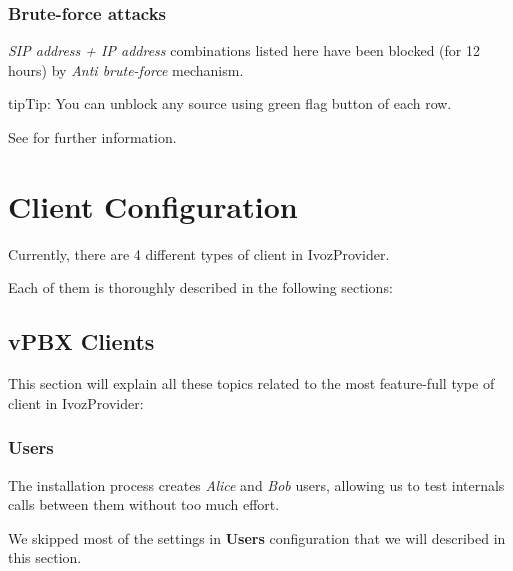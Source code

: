 \documentclass[letterpaper,10pt,english]{sphinxmanual}
\begin{document}
\subsection{Brute-force attacks}
\label{administration_portal/brand/views/bruteforce_attacks::doc}\label{administration_portal/brand/views/bruteforce_attacks:brute-force-attacks}
\emph{SIP address + IP address} combinations listed here have been blocked (for 12 hours) by \emph{Anti brute-force} mechanism.

\begin{notice}{tip}{Tip:}
You can unblock any source using green flag button of each row.
\end{notice}

See {\hyperref[security_and_maintenance/security/antibruteforce:anti\string-brute\string-force\string-attacks]{}} for further information.


\chapter{Client Configuration}
\label{administration_portal/client/index:client-configuration}\label{administration_portal/client/index::doc}
Currently, there are 4 different types of client in IvozProvider.

Each of them is thoroughly described in the following sections:


\section{vPBX Clients}
\label{administration_portal/client/vpbx/index:vpbx-clients}\label{administration_portal/client/vpbx/index::doc}
This section will explain all these topics related to the most feature-full type of client in IvozProvider:


\subsection{Users}
\label{administration_portal/client/vpbx/users::doc}\label{administration_portal/client/vpbx/users:users}\label{administration_portal/client/vpbx/users:id1}
The installation process creates \emph{Alice} and \emph{Bob} users, allowing us
to test internals calls between them without too much effort.

We skipped most of the settings in \textbf{Users} configuration that we will described
in this section.
\end{document}
